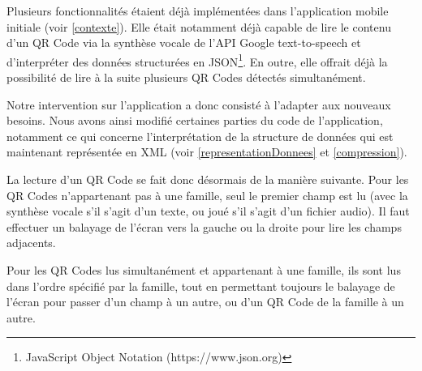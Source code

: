 
\par
Plusieurs fonctionnalités étaient déjà implémentées dans l'application mobile initiale (voir \ref{contexte}). Elle était notamment déjà capable de lire le contenu d'un QR Code via la synthèse vocale de l'API Google text-to-speech et d'interpréter des données structurées en JSON\footnote{JavaScript Object Notation (https://www.json.org)}. En outre, elle offrait déjà la possibilité de lire à la suite plusieurs QR Codes détectés simultanément.

\par
Notre intervention sur l'application a donc consisté à l'adapter aux nouveaux besoins.
Nous avons ainsi modifié certaines parties du code de l’application, notamment ce qui concerne l'interprétation de la structure de données qui est maintenant représentée en XML (voir \ref{representationDonnees} et \ref{compression}).\\

\par
La lecture d’un QR Code se fait donc désormais de la manière suivante. Pour les QR Codes n'appartenant pas à une famille, seul le premier champ est lu (avec la synthèse vocale s'il s'agit d'un texte, ou joué s'il s'agit d'un fichier audio). Il faut effectuer un balayage de l'écran vers la gauche ou la droite pour lire les champs adjacents.
\par
Pour les QR Codes lus simultanément et appartenant à une famille, ils sont lus dans l'ordre spécifié par la famille, tout en permettant toujours le balayage de l'écran pour passer d'un champ à un autre, ou d'un QR Code de la famille à un autre.

